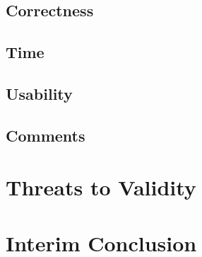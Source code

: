 \documentclass[../thesis]{subfiles}
\begin{document}
\violinsus{}

\subsection{Correctness}
\fxfatal{}

\subsection{Time}
\fxfatal{}

\subsection{Usability}
\fxfatal{}


\subsection{Comments}
\fxfatal{}

\section{Threats to Validity}
\fxfatal{}

\section{Interim Conclusion}  %
\fxfatal{}
\end{document}
